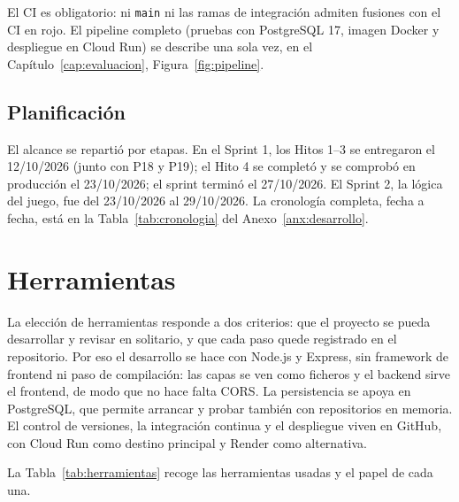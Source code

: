 El CI es obligatorio: ni \texttt{main} ni las ramas de integración admiten fusiones con el CI en rojo. El pipeline completo (pruebas con PostgreSQL 17, imagen Docker y despliegue en Cloud Run) se describe una sola vez, en el Capítulo~\ref{cap:evaluacion}, Figura~\ref{fig:pipeline}.

\subsection{Planificación}

El alcance se repartió por etapas. En el Sprint 1, los Hitos 1--3 se entregaron el 12/10/2026 (junto con P18 y P19); el Hito 4 se completó y se comprobó en producción el 23/10/2026; el sprint terminó el 27/10/2026. El Sprint 2, la lógica del juego, fue del 23/10/2026 al 29/10/2026. La cronología completa, fecha a fecha, está en la Tabla~\ref{tab:cronologia} del Anexo~\ref{anx:desarrollo}.

\section{Herramientas}

La elección de herramientas responde a dos criterios: que el proyecto se pueda desarrollar y revisar en solitario, y que cada paso quede registrado en el repositorio. Por eso el desarrollo se hace con Node.js y Express, sin framework de frontend ni paso de compilación: las capas se ven como ficheros y el backend sirve el frontend, de modo que no hace falta CORS. La persistencia se apoya en PostgreSQL, que permite arrancar y probar también con repositorios en memoria. El control de versiones, la integración continua y el despliegue viven en GitHub, con Cloud Run como destino principal y Render como alternativa.

La Tabla~\ref{tab:herramientas} recoge las herramientas usadas y el papel de cada una.

